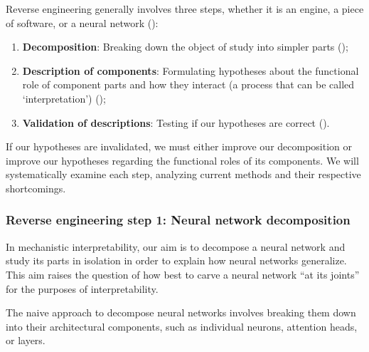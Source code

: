 Reverse engineering generally involves three steps, whether it is an engine, a piece of software, or a neural network ():
\begin{enumerate}
    \item \textbf{Decomposition}: Breaking down the object of study into simpler parts ();
    \item \textbf{Description of components}: Formulating hypotheses about the functional role of component parts and how they interact (a process that can be called `interpretation') ();
    \item \textbf{Validation of descriptions}: Testing if our hypotheses are correct ().
\end{enumerate}

If our hypotheses are invalidated, we must either improve our decomposition or improve our hypotheses regarding the functional roles of its components. We will systematically examine each step, analyzing current methods and their respective shortcomings.

\subsubsection{Reverse engineering step 1: Neural network decomposition}
\label{subsec:reverse-engineering-step-1}

In mechanistic interpretability, our aim is to decompose a neural network and study its parts in isolation in order to explain how neural networks generalize. This aim raises the question of how best to carve a neural network “at its joints” for the purposes of interpretability.

\label{par:decomposition}

The naive approach to decompose neural networks involves breaking them down into their architectural components, such as individual neurons, attention heads, or layers.

